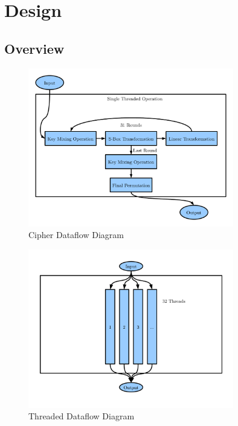 \section{Design}

\subsection{Overview}

\begin{figure}[H]
\centering
\includegraphics[width=0.8\textwidth]{Design-Overview-Cipher.pdf}
\caption{Cipher Dataflow Diagram}
\end{figure}

\begin{figure}[H]
\centering
\includegraphics[width=0.8\textwidth]{Design-Overview-Threaded.pdf}
\caption{Threaded Dataflow Diagram}
\end{figure}
